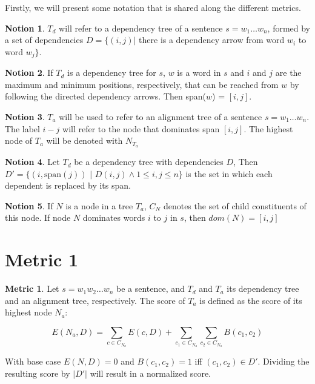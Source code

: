 \documentclass{report}
\theoremstyle{definition}
\newtheorem{metric}{Metric}
\newtheorem{notion}{Notion}
\theoremstyle{plain}
\begin{document}
Firstly, we will present some notation that is shared along the different metrics.

\begin{notion}
$T_d$ will refer to a dependency tree of a sentence $s = w_1 \dots w_n$, formed by a set of dependencies $D = \{ (i,j) |$ there is a dependency arrow from word $w_i$ to word $w_j \}$.
\end{notion}

\begin{notion}
If $T_d$ is a dependency tree for $s$, $w$ is a word in $s$ and $i$ and $j$ are the maximum and minimum positions, respectively, that can be reached from $w$ by following the directed dependency arrows. Then span($w$) = $[i,j]$.
\end{notion}

\begin{notion}
$T_a$ will be used to refer to an alignment tree of a sentence $s = w_1 \dots w_n$. The label $i-j$ will refer to the node that dominates span $[i,j]$. The highest node of $T_a$ will be denoted with $N_{T_a}$
\end{notion}

\begin{notion}
Let $T_d$ be a dependency tree with dependencies $D$, Then $D' = \{ (i,\textrm{span}(j))$ $|$ $D(i,j) \land 1 \leq i,j \leq n \}$ is the set in which each dependent is replaced by its span.
\end{notion}

\begin{notion}
If $N$ is a node in a tree $T_a$, $C_N$ denotes the set of child constituents of this node. If node $N$ dominates words $i$ to $j$ in $s$, then $dom(N)= [i,j]$
\end{notion}

\section{Metric 1}

\begin{metric}\label{m1}
Let $s = w_1 w_2 \dots w_n$ be a sentence, and $T_d$ and $T_a$ its dependency tree and an alignment tree, respectively. The score of $T_a$ is defined as the score of its highest node $N_{a}$:

$$
E(N_a,D) = \sum_{c\in C_{N_a}} E(c,D)+ \sum_{c_1\in C_{N_a}} \sum_{c_2\in C_{N_a}} B(c_1,c_2)
$$

\noindent With base case $E(N,D) = 0$ and $B(c_1,c_2) = 1$ iff  $(c_1,c_2)\in D'$. Dividing the resulting score by $|D'|$ will result in a normalized score.
\end{metric}
\end{document}
